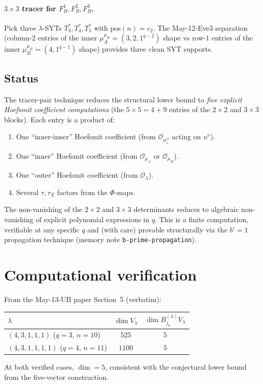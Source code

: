 \documentclass[11pt]{article}
\theoremstyle{definition}
\begin{document}
\paragraph{$3 \times 3$ tracer for $F_B^1, F_B^2, F_B^3$.}
Pick three $\lambda$-SYTs $T^*_3, T^*_4, T^*_5$ with
$\mathrm{pos}(n) = c_2$. The May-12-Eve3 separation (column-$2$ entries
of the inner $\mu_A^{\mu_B} = (3, 2, 1^{q-2})$ shape vs row-$1$ entries
of the inner $\mu_B^{\mu_B} = (4, 1^{q-1})$ shape) provides three
clean SYT supports.

\subsection{Status}

The tracer-pair technique reduces the structural lower bound to
\emph{five explicit Hoefsmit coefficient computations} (the
$5 \times 5 = 4 + 9$ entries of the $2 \times 2$ and $3 \times 3$
blocks). Each entry is a product of:
\begin{enumerate}[leftmargin=2em,topsep=0.2em,itemsep=0.1em]
\item One ``inner-inner'' Hoefsmit coefficient (from
$\mathcal{O}_{\mu_1^A}$ acting on $u^\nu$).
\item One ``inner'' Hoefsmit coefficient (from $\mathcal{O}_{\mu_A}$
or $\mathcal{O}_{\mu_B}$).
\item One ``outer'' Hoefsmit coefficient (from $\mathcal{O}_\lambda$).
\item Several $\tau, \tau_X$ factors from the $\Phi$-maps.
\end{enumerate}
The non-vanishing of the $2 \times 2$ and $3 \times 3$ determinants
reduces to algebraic non-vanishing of explicit polynomial
expressions in $q$. This is a finite computation, verifiable at any
specific $q$ and (with care) provable structurally via the $b' = 1$
propagation technique (memory note
\texttt{b-prime-propagation}).

\section{Computational verification}\label{sec:verify}

From the May-13-UB paper Section~5 (verbatim):
\begin{center}
\begin{tabular}{lcc}
\toprule
$\lambda$ & $\dim V_\lambda$ & $\dim B^{(\lambda)}_{j_0} V_\lambda$ \\
\midrule
$(4, 3, 1, 1, 1)$ \quad ($q = 3$, $n = 10$) & $525$ & $5$ \\
$(4, 3, 1, 1, 1, 1)$ \quad ($q = 4$, $n = 11$) & $1100$ & $5$ \\
\bottomrule
\end{tabular}
\end{center}
At both verified cases, $\dim = 5$, consistent with the conjectural
lower bound from the five-vector construction.
\end{document}
